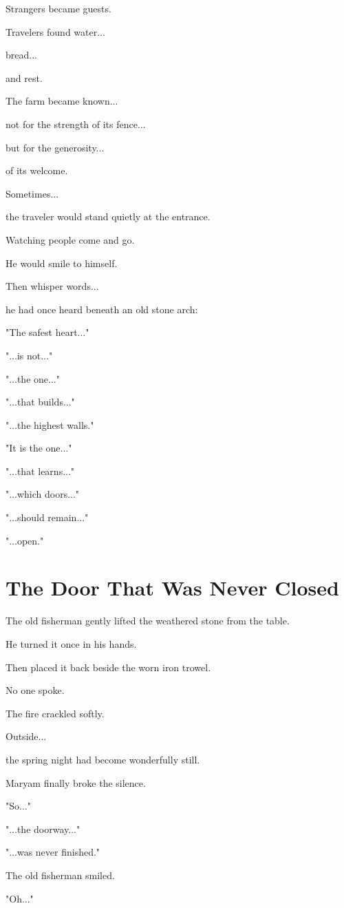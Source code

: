 \documentclass[12pt,openany]{book}
\begin{document}
Strangers became guests.

Travelers found water...

bread...

and rest.

The farm became known...

not for the strength of its fence...

but for the generosity...

of its welcome.

Sometimes...

the traveler would stand quietly at the entrance.

Watching people come and go.

He would smile to himself.

Then whisper words...

he had once heard beneath an old stone arch:

"The safest heart..."

"...is not..."

"...the one..."

"...that builds..."

"...the highest walls."

"It is the one..."

"...that learns..."

"...which doors..."

"...should remain..."

"...open."
\section*{The Door That Was Never Closed}

The old fisherman gently lifted the weathered stone from the table.

He turned it once in his hands.

Then placed it back beside the worn iron trowel.

No one spoke.

The fire crackled softly.

Outside...

the spring night had become wonderfully still.

Maryam finally broke the silence.

"So..."

"...the doorway..."

"...was never finished."

The old fisherman smiled.

"Oh..."
\end{document}
